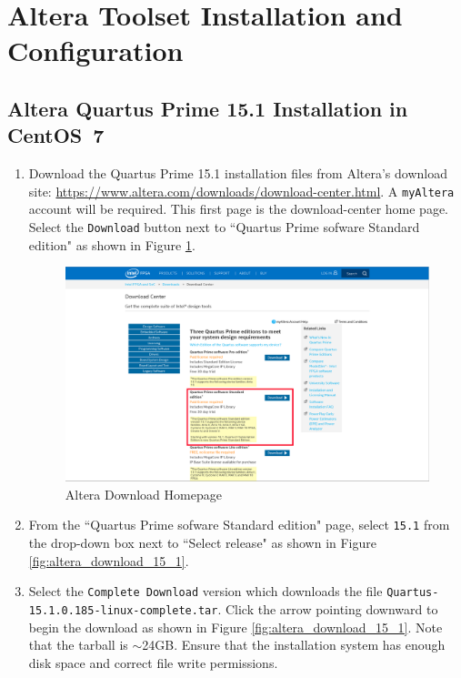 \newpage

\section{Altera Toolset Installation and Configuration}
\subsection{Altera Quartus Prime 15.1 Installation in CentOS~7}
\begin{flushleft}
\begin{enumerate}
\item Download the Quartus Prime 15.1 installation files from Altera's download site: \url{https://www.altera.com/downloads/download-center.html}. A \verb+myAltera+ account will be required. This first page is the download-center home page. Select the \verb+Download+ button next to ``Quartus Prime sofware Standard edition" as shown in Figure \ref{fig:altera_download_center}.
\begin{figure}[ht]
	\centerline{\includegraphics[scale=0.4]{figures/altera_download_center}}
	\caption{Altera Download Homepage}
	\label{fig:altera_download_center}
\end{figure}
\item From the ``Quartus Prime sofware Standard edition" page, select \verb+15.1+ from the drop-down box next to ``Select release" as shown in Figure \ref{fig:altera_download_15_1}.
\item Select the \verb+Complete Download+ version which downloads the file \verb+Quartus-15.1.0.185-linux-complete.tar+. Click the arrow pointing downward to begin the download as shown in Figure \ref{fig:altera_download_15_1}. Note that the tarball is $\sim$24GB. Ensure that the installation system has enough disk space and correct file write permissions.\pagebreak

\end{enumerate}
\end{flushleft}
